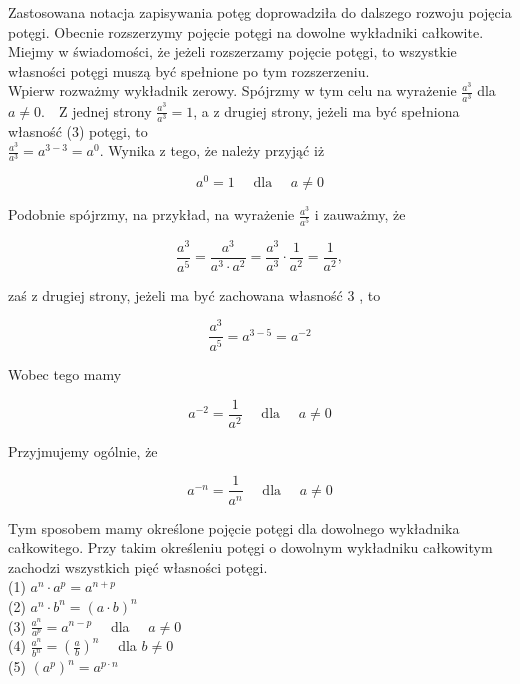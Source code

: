 \documentclass[10pt]{article}
\begin{document}
Zastosowana notacja zapisywania potęg doprowadziła do dalszego rozwoju pojęcia potęgi. Obecnie rozszerzymy pojęcie potęgi na dowolne wykładniki całkowite. Miejmy w świadomości, że jeżeli rozszerzamy pojęcie potęgi, to wszystkie własności potęgi muszą być spełnione po tym rozszerzeniu.\\
Wpierw rozważmy wykładnik zerowy. Spójrzmy w tym celu na wyrażenie \(\frac{a^{3}}{a^{3}}\) dla \(a \neq 0 . \quad \mathrm{Z}\) jednej strony \(\frac{a^{3}}{a^{3}}=1\), a z drugiej strony, jeżeli ma być spełniona własność (3) potęgi, to\\
\(\frac{a^{3}}{a^{3}}=a^{3-3}=a^{0}\). Wynika z tego, że należy przyjąć iż

\[
a^{0}=1 \quad \text { dla } \quad a \neq 0
\]

Podobnie spójrzmy, na przykład, na wyrażenie \(\frac{a^{3}}{a^{5}}\) i zauważmy, że

\[
\frac{a^{3}}{a^{5}}=\frac{a^{3}}{a^{3} \cdot a^{2}}=\frac{a^{3}}{a^{3}} \cdot \frac{1}{a^{2}}=\frac{1}{a^{2}},
\]

zaś z drugiej strony, jeżeli ma być zachowana własność 3 , to

\[
\frac{a^{3}}{a^{5}}=a^{3-5}=a^{-2}
\]

Wobec tego mamy

\[
a^{-2}=\frac{1}{a^{2}} \quad \text { dla } \quad a \neq 0
\]

Przyjmujemy ogólnie, że

\[
a^{-n}=\frac{1}{a^{n}} \quad \text { dla } \quad a \neq 0
\]

Tym sposobem mamy określone pojęcie potęgi dla dowolnego wykładnika całkowitego. Przy takim określeniu potęgi o dowolnym wykładniku całkowitym zachodzi wszystkich pięć własności potęgi.\\
(1) \(a^{n} \cdot a^{p}=a^{n+p}\)\\
(2) \(a^{n} \cdot b^{n}=(a \cdot b)^{n}\)\\
(3) \(\frac{a^{n}}{a^{p}}=a^{n-p} \quad\) dla \(\quad a \neq 0\)\\
(4) \(\frac{a^{n}}{b^{n}}=\left(\frac{a}{b}\right)^{n} \quad\) dla \(b \neq 0\)\\
(5) \(\left(a^{p}\right)^{n}=a^{p \cdot n}\)
\end{document}

